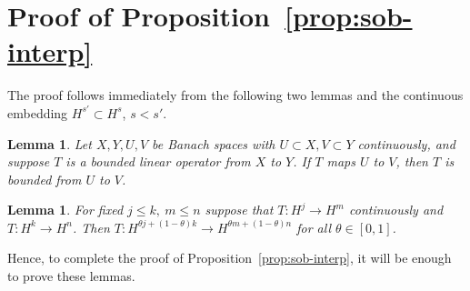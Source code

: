\documentclass[12pt,reqno]{amsart}
\numberwithin{equation}{section}  %
\numberwithin{figure}{section}
\newtheorem{lemma}[theorem]{Lemma}
\begin{document}
  \section{Proof of Proposition~\ref{prop:sob-interp}}
\label{ssec:pf-sob-interp}
The proof follows immediately from the following two lemmas and the continuous
embedding $H^{s'} \subset H^{s}$, $s < s'$.
%
%
%
%
%                
%
%
%
%
\begin{lemma}
\label{lem:rest-bound}
Let $X, Y, U, V$ be Banach spaces with $U \subset X, V \subset Y$ continuously,
and suppose $T$ is a bounded linear operator from $X$ to $Y$. If $T$ maps $U$
to $V$, then $T$ is bounded from $U$ to $V$.
\end{lemma}
%
%
%
%
%
%
%
%
%
\begin{lemma}
\label{lem:interp-spaces}
For fixed $j \le k, \ m \le n$ suppose that $T: H^{j} \to H^{m}$
continuously and $T: H^{k} \to H^{n}$. Then
$T: H^{\theta j + (1 - \theta)k} \to H^{\theta m +
(1 - \theta) n}$ for all $\theta \in [0,1]$.
%
%
%
\end{lemma}
%
%
%
Hence, to complete the proof of Proposition~\ref{prop:sob-interp},
it will be enough to prove these lemmas.
%
\end{document}
